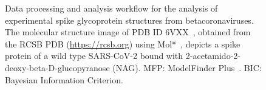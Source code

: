 \begin{figure}[htbp]
\begin{tikzpicture}
    \end{tikzpicture}
    \caption{Data processing and analysis workflow for the analysis of experimental spike glycoprotein structures from betacoronaviruses. The molecular structure image of PDB ID 6VXX~\cite{walls2019}, obtained from the RCSB PDB (\url{https://rcsb.org}) using Mol*~\cite{sehnal2021}, depicts a spike protein of a wild type SARS-CoV-2 bound with 2-acetamido-2-deoxy-beta-D-glucopyranose (NAG). MFP: ModelFinder Plus~\cite{kalyaanamoorthy2017}. BIC: Bayesian Information Criterion.}
    \label{fig:bcov3d_dag}
\end{figure}